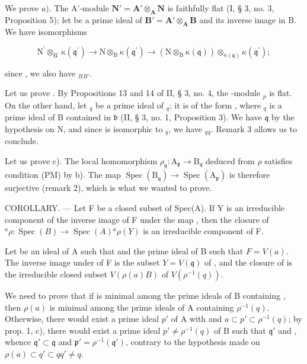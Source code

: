 We prove \(a)\). The A'-module \(\mathbf{N}' = \mathbf{A}' \otimes_{\mathbf{A}} \mathbf{N}\) is faithfully flat (I, § 3, no. 3, Proposition 5); let  be a prime ideal of \(\mathbf{B}' = \mathbf{A}' \otimes_{\mathbf{A}} \mathbf{B}\) and  its inverse image in B. We have isomorphisms

\[
\mathrm{N} ^ {\prime} \otimes_ {\mathrm{B} ^ {\prime}} \kappa (\mathfrak {q} ^ {\prime}) \rightarrow \mathrm{N} \otimes_ {\mathrm{B}} \kappa (\mathfrak {q} ^ {\prime}) \rightarrow (\mathrm{N} \otimes_ {\mathrm{B}} \kappa (\mathfrak {q})) \otimes_ {\kappa (\mathfrak {q})} \kappa (\mathfrak {q} ^ {\prime});
\]

since , we also have \(_{B}\)\(_{B'}\).

Let us prove . By Propositions 13 and 14 of II, § 3, no. 4, the -module \(_{p}\) is flat. On the other hand, let \(_{q}\) be a prime ideal of \(_{q}\); it is of the form , where \(_{q}\) is a prime ideal of B contained in \(\mathfrak{b}\) (II, § 3, no. 1, Proposition 3). We have \(\mathfrak{q}\) by the hypothesis on N, and since  is isomorphic to \(_{q}\), we have \(_{q}\)\(_{q}\). Remark 3 allows us to conclude.

Let us prove c). The local homomorphism \(\rho_{\mathfrak{q}}: \mathrm{A}_{\mathfrak{p}} \to \mathrm{B}_{\mathfrak{q}}\) deduced from \(\rho\) satisfies condition (PM) by b). The map \(\operatorname{Spec}(\mathrm{B}_{\mathfrak{q}}) \to \operatorname{Spec}(\mathrm{A}_{\mathfrak{p}})\) is therefore surjective (remark 2), which is what we wanted to prove.

COROLLARY. --- Let F be a closed subset of Spec(A). If Y is an irreducible component of the inverse image of F under the map , then the closure of \(^{a}\rho : \operatorname{Spec}(B) \to \operatorname{Spec}(A)\)\(^{a}\rho(Y)\) is an irreducible component of F.

Let  be an ideal of A such that  and  the prime ideal of B such that \(F = V(a)\). The inverse image under  of F is the subset \(Y = V(\mathfrak{q})\) of , and the closure of  is the irreducible closed subset \(V(\rho(a)B)\) of \(V(\rho^{-1}(q))\).

We need to prove that if  is minimal among the prime ideals of B containing , then \(\rho(a)\) is minimal among the prime ideals of A containing \(\rho^{-1}(q)\). Otherwise, there would exist a prime ideal \(p'\) of A with  and \(a \subset p' \subset \rho^{-1}(q)\); by prop. 1, c), there would exist a prime ideal \(p' \neq \rho^{-1}(q)\) of B such that \(\mathfrak{q}'\) and , whence \(\mathfrak{q}' \subset \mathfrak{q}\) and \(\mathfrak{p}' = \rho^{-1}(\mathfrak{q}')\), contrary to the hypothesis made on \(\rho(a) \subset q' \subset q\)\(q' \neq q\).

